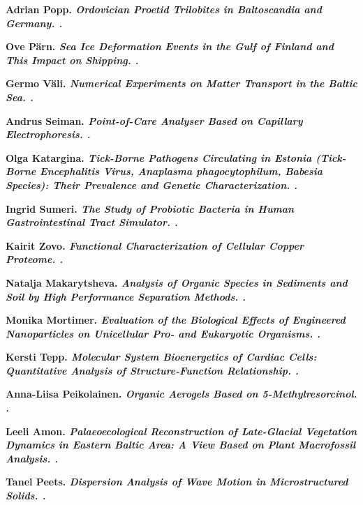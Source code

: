 \begin{list}
\item \bf Adrian Popp. \it Ordovician Proetid Trilobites in Baltoscandia and
  Germany. .

\item \bf Ove P\"arn. \it Sea Ice Deformation Events in the Gulf of Finland
  and This Impact on Shipping. .

\item \bf Germo V\"ali. \it Numerical Experiments on Matter Transport in the
  Baltic Sea. .

\item \bf Andrus Seiman. \it Point-of-Care Analyser Based on Capillary
  Electrophoresis. .

\item \bf Olga Katargina. \it Tick-Borne Pathogens Circulating in Estonia
  (Tick-Borne Encephalitis Virus, Anaplasma phagocytophilum, Babesia
  Species): Their Prevalence and Genetic Characterization. .

\item \bf Ingrid Sumeri. \it The Study of Probiotic Bacteria in Human
  Gastrointestinal Tract Simulator. .

\item \bf Kairit Zovo. \it Functional Characterization of Cellular Copper
  Proteome. .

\item \bf Natalja Makarytsheva. \it Analysis of Organic Species in Sediments
  and Soil by High Performance Separation Methods. .

\item \bf Monika Mortimer. \it Evaluation of the Biological Effects of
  Engineered Nanoparticles on Unicellular Pro- and Eukaryotic
  Organisms. .

\item \bf Kersti Tepp. \it Molecular System Bioenergetics of Cardiac Cells:
  Quantitative Analysis of Structure-Function Relationship. .

\item \bf Anna-Liisa Peikolainen. \it Organic Aerogels Based on
  5-Methylresorcinol. .

\item \bf Leeli Amon. \it Palaeoecological Reconstruction of Late-Glacial
  Vegetation Dynamics in Eastern Baltic Area: A View Based on Plant
  Macrofossil Analysis. .

\item \bf Tanel Peets. \it Dispersion Analysis of Wave Motion in
  Microstructured Solids. .


\end{list}
